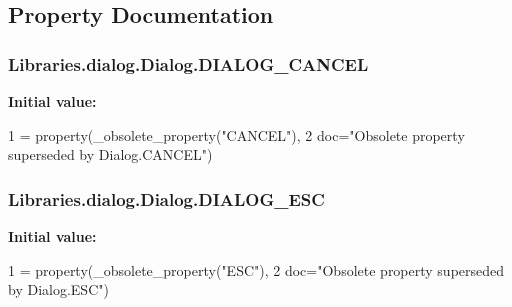 \subsection{Property Documentation}
\subsubsection[{\texorpdfstring{D\+I\+A\+L\+O\+G\+\_\+\+C\+A\+N\+C\+EL}{DIALOG_CANCEL}}]{\setlength{\rightskip}{0pt plus 5cm}Libraries.\+dialog.\+Dialog.\+D\+I\+A\+L\+O\+G\+\_\+\+C\+A\+N\+C\+EL\hspace{0.3cm}{\ttfamily [static]}}\hypertarget{class_libraries_1_1dialog_1_1_dialog_a936196f8ae9d0c7e5f94fdeb2ea4288e}{}\label{class_libraries_1_1dialog_1_1_dialog_a936196f8ae9d0c7e5f94fdeb2ea4288e}
{\bfseries Initial value\+:}
\begin{DoxyCode}
1 = property(\_obsolete\_property(\textcolor{stringliteral}{"CANCEL"}),
2                          doc=\textcolor{stringliteral}{"Obsolete property superseded by Dialog.CANCEL"})
\end{DoxyCode}
\subsubsection[{\texorpdfstring{D\+I\+A\+L\+O\+G\+\_\+\+E\+SC}{DIALOG_ESC}}]{\setlength{\rightskip}{0pt plus 5cm}Libraries.\+dialog.\+Dialog.\+D\+I\+A\+L\+O\+G\+\_\+\+E\+SC\hspace{0.3cm}{\ttfamily [static]}}\hypertarget{class_libraries_1_1dialog_1_1_dialog_a354f23479c0658068f38388085c68ecc}{}\label{class_libraries_1_1dialog_1_1_dialog_a354f23479c0658068f38388085c68ecc}
{\bfseries Initial value\+:}
\begin{DoxyCode}
1 = property(\_obsolete\_property(\textcolor{stringliteral}{"ESC"}),
2                          doc=\textcolor{stringliteral}{"Obsolete property superseded by Dialog.ESC"})
\end{DoxyCode}
